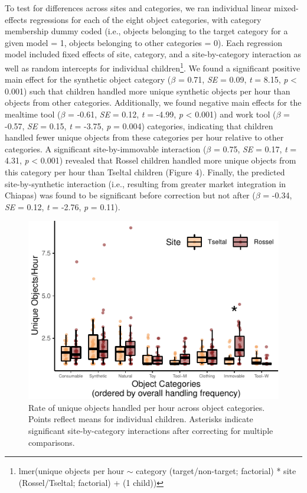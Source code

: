 \documentclass[10pt, letterpaper]{article}
\newenvironment{CodeChunk}{}{}
\begin{document}
To test for differences across sites and categories, we ran individual
linear mixed-effects regressions for each of the eight object
categories, with category membership dummy coded (i.e., objects
belonging to the target category for a given model = 1, objects
belonging to other categories = 0). Each regression model included fixed
effects of site, category, and a site-by-category interaction as well as
random intercepts for individual children\footnote{lmer(unique objects
  per hour \({\sim}\) category (target/non-target; factorial) * site
  (Rossel/Tseltal; factorial) + (1 \textbar{} child))}. We found a
significant positive main effect for the synthetic object category
(\(\beta\) = 0.71, \emph{SE} = 0.09, \emph{t} = 8.15, \emph{p}
\textless{} 0.001) such that children handled more unique synthetic
objects per hour than objects from other categories. Additionally, we
found negative main effects for the mealtime tool (\(\beta\) = -0.61,
\emph{SE} = 0.12, \emph{t} = -4.99, \emph{p} \textless{} 0.001) and work
tool (\(\beta\) = -0.57, \emph{SE} = 0.15, \emph{t} = -3.75, \emph{p} =
0.004) categories, indicating that children handled fewer unique objects
from these categories per hour relative to other categories. A
significant site-by-immovable interaction (\(\beta\) = 0.75, \emph{SE} =
0.17, \emph{t} = 4.31, \emph{p} \textless{} 0.001) revealed that Rossel
children handled more unique objects from this category per hour than
Tseltal children (Figure 4). Finally, the predicted site-by-synthetic
interaction (i.e., resulting from greater market integration in Chiapas)
was found to be significant before correction but not after (\(\beta\) =
-0.34, \emph{SE} = 0.12, \emph{t} = -2.76, \emph{p} = 0.11).

\begin{CodeChunk}
\begin{figure}[!h]

\includegraphics{figs/overall-stats-fig-1} \hfill{}

\caption[Rate of unique objects handled per hour across object categories]{Rate of unique objects handled per hour across object categories. Points reflect means for individual children. Asterisks indicate significant site-by-category interactions after correcting for multiple comparisons.}\label{fig:overall-stats-fig}
\end{figure}
\end{CodeChunk}
\end{document}
